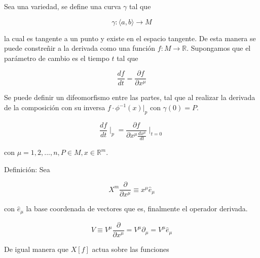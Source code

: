 \documentclass{report}
\begin{document}




Sea una variedad, se define una curva $\gamma$ tal que

\begin{equation}
\gamma : \langle a, b\rangle \rightarrow M
\end{equation}

la cual es tangente a un punto y existe en el espacio tangente. De esta manera se puede constreñir a la derivada como una función $f : M \rightarrow \mathbb{R}$. Supongamos que el parámetro de cambio es el tiempo $t$ tal que

\begin{equation}
\frac{df}{dt} = \frac{\partial f}{\partial x^{\mu}}
\end{equation}

Se puede definir un difeomorfismo entre las partes, tal que al realizar la derivada de la composición con su inversa $f \cdot \phi ^{-1} (x) |_{p}$ con $\gamma (0) = P$.

\begin{equation}
\frac{df}{dt} \mid _{p} = \frac{\partial f}{\partial x^{\mu} \frac{dx^{\mu}}{dt}}\mid_{t=0}
\end{equation}

con $\mu = 1, 2, ..., n, P \in M, x \in \mathbb{R}^{m}$.

Definición: Sea

\begin{equation}
X^{m} \frac{\partial}{\partial x^{\mu}}\equiv x^{\mu} \hat e_{\mu}
\end{equation}

con $\hat e_{\mu}$ la base coordenada de vectores que es, finalmente el operador derivada.

\begin{equation}
V \equiv V^{\mu} \frac{\partial}{\partial x^{\mu }} = V^{\mu} \partial _{\mu} = V^{\mu} \hat e_{\mu}
\end{equation}

De igual manera que $X[f]$ actua sobre las funciones
\end{document}
